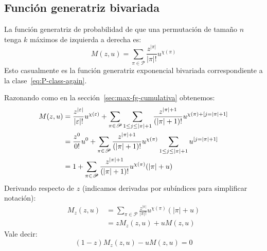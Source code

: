 \subsection{Función generatriz bivariada}
\label{sec:max-fg-bivariada}

  La función generatriz de probabilidad de que una permutación de tamaño \(n\)
  tenga \(k\) máximos de izquierda a derecha es:
  \begin{equation}
    \label{eq:M-pgf}
    M(z, u)
      = \sum_{\pi \in \mathscr{P}}
          \frac{z^{\lvert \pi \rvert}}{\lvert \pi \rvert !}
            u^{\chi(\pi)}
  \end{equation}
  Esto casualmente es la función generatriz exponencial bivariada
  correspondiente a la clase~\eqref{eq:P-class-again}.

  Razonando como en la sección~\ref{sec:max-fg-cumulativa}
  obtenemos:
  \begin{align}
    M(z, u)
      &= \frac{z^{\lvert \varepsilon \rvert}}{\lvert \varepsilon \rvert !}
           u^{\chi(\varepsilon)}
           + \sum_{\pi \in \mathscr{P}}
               \sum_{1 \le j \le \lvert \pi \rvert + 1}
                 \frac{z^{\lvert \pi \rvert + 1}}
                      {(\lvert \pi \rvert + 1)!}
                   u^{\chi(\pi) + [j = \lvert \pi \rvert + 1]}
                      \label{eq:M-decomposed} \\
      &= \frac{z^0}{0!} u^0
           + \sum_{\pi \in \mathscr{P}}
               \frac{z^{\lvert \pi \rvert + 1}}{(\lvert \pi \rvert + 1)!}
                  u^{\chi(\pi)}
               \sum_{1 \le j \le \lvert \pi \rvert + 1}
                 u^{[j = \lvert \pi \rvert + 1]}
                      \notag  \\
      &= 1
           + \sum_{\pi \in \mathscr{P}}
               \frac{z^{\lvert \pi \rvert + 1}}{(\lvert \pi \rvert + 1)!}
                  u^{\chi(\pi)} (\lvert \pi \rvert + u)
                      \label{eq:M-decomposed-result}
  \end{align}
  Derivando respecto de \(z\)
  (indicamos derivadas por subíndices para simplificar notación):
  \begin{align*}
    M_z(z, u)
      &= \sum_{\pi \in \mathscr{P}}
           \frac{z^{\lvert \pi \rvert}}{\lvert \pi \rvert !}
           u^{\chi(\pi)}
           (\lvert \pi \rvert + u) \\
      &= z M_z(z, u) + u M(z, u)
  \end{align*}
  Vale decir:
  \begin{equation}
    \label{eq:M-pde}
    (1 - z) M_z(z, u) - u M(z, u)
      = 0
  \end{equation}
